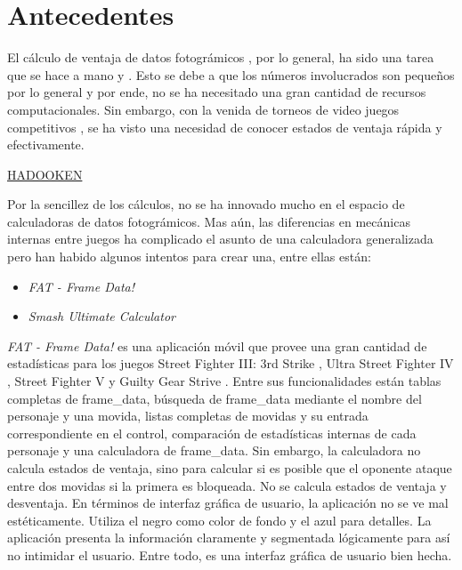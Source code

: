 \section{Antecedentes}

El cálculo de ventaja de datos fotográmicos \cite{noauthor_fighting_nodate-1}, por lo general, ha sido una tarea que se hace a mano \cite{noauthor_guide_nodate} y \cite{dustloop_using_2022}. Esto se debe a que los números involucrados son pequeños por lo general y por ende, no se ha necesitado una gran cantidad de recursos computacionales. Sin embargo, con la venida de  torneos de video juegos competitivos \cite{willingham_what_2018}, se ha visto una necesidad de conocer estados de ventaja rápida y efectivamente. 

\href{https://qph.cf2.quoracdn.net/main-qimg-35650aa12d02e1700face4fbf71f4cfd}{HADOOKEN} 
\cite{noauthor_grasshopper_nodate} 

Por la sencillez de los cálculos, no se ha innovado mucho en el espacio de calculadoras de datos fotográmicos. Mas aún, las diferencias en mecánicas internas entre juegos ha complicado el asunto de una calculadora generalizada pero han habido algunos intentos para crear una, entre ellas están:
\begin{itemize}
    \item \textit{FAT - Frame Data!} \cite{d4rkonion_fat_2022}
    \item \textit{Smash Ultimate Calculator} \cite{noauthor_rubendalssbu-calculator_nodate}
\end{itemize}

\textit{FAT - Frame Data!} es una aplicación móvil que provee una gran cantidad de estadísticas para los juegos Street Fighter III: 3rd Strike \cite{noauthor_street_2022}, Ultra Street Fighter IV \cite{noauthor_street_2022-1}, Street Fighter V \cite{noauthor_street_2022-2} y Guilty Gear Strive \cite{noauthor_guilty_2022}. Entre sus funcionalidades están tablas completas de \gls{frame_data}, búsqueda de \gls{frame_data} mediante el nombre del personaje y una movida, listas completas de movidas y su entrada correspondiente en el control, comparación de estadísticas internas de cada personaje y una calculadora de \gls{frame_data}. Sin embargo, la calculadora no calcula estados de ventaja, sino para calcular si es posible que el oponente ataque entre dos movidas si la primera es bloqueada. No se calcula estados de ventaja y desventaja. En términos de interfaz gráfica de usuario, la aplicación no se ve mal estéticamente. Utiliza el negro como color de fondo y el azul para detalles. La aplicación presenta la información claramente y segmentada lógicamente para así no intimidar el usuario. Entre todo, es una interfaz gráfica de usuario bien hecha.

